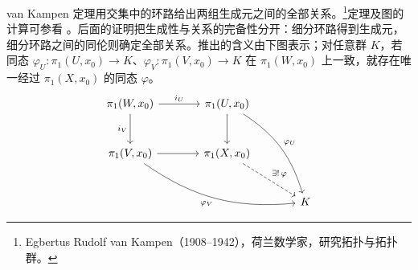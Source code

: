 van Kampen 定理用交集中的环路给出两组生成元之间的全部关系。\footnote{Egbertus Rudolf van Kampen（1908--1942），荷兰数学家，研究拓扑与拓扑群。}定理及图的计算可参看 \cite[第1.2、1.A节]{Hatcher2002}。后面的证明把生成性与关系的完备性分开：细分环路得到生成元，细分环路之间的同伦则确定全部关系。推出的含义由下图表示；对任意群 \(K\)，若同态 \(\varphi_U:\pi_1(U,x_0)\rightarrow K\)、\(\varphi_V:\pi_1(V,x_0)\rightarrow K\) 在 \(\pi_1(W,x_0)\) 上一致，就存在唯一经过 \(\pi_1(X,x_0)\) 的同态 \(\varphi\)。
\[
	\begin{tikzcd}[column sep=large,row sep=large]
		\pi_1(W,x_0) \arrow[r,"i_U"] \arrow[d,"i_V"'] & \pi_1(U,x_0) \arrow[d] \arrow[ddr,bend left=20,"\varphi_U"] & \\
		\pi_1(V,x_0) \arrow[r] \arrow[drr,bend right=20,"\varphi_V"'] & \pi_1(X,x_0) \arrow[dr,dashed,"\exists!\,\varphi"] & \\
		& & K
	\end{tikzcd}
\]
